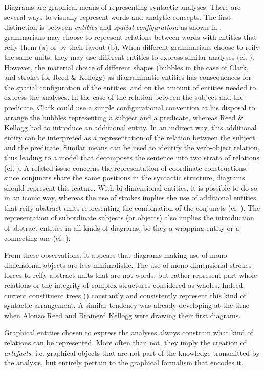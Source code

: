 \documentclass[output=paper]{langsci/langscibook}
\begin{document}
Diagrams are graphical means of representing syntactic analyses. There are several ways to visually represent words and analytic concepts. The first distinction is between \textit{entities} and \textit{spatial configuration}: as shown in , grammarians may choose to represent relations between words with entities that reify them (a) or by their layout (b). When different grammarians choose to reify the same units, they may use different entities to express similar analyses (cf. ). However, the material choice of different shapes (bubbles in the case of Clark, and strokes for Reed \& Kellogg) as diagrammatic entities has consequences for the spatial configuration of the entities, and on the amount of entities needed to express the analyses. In the case of the relation between the subject and the predicate, Clark could use a simple configurational convention at his disposal to arrange the bubbles representing a subject and a predicate, whereas Reed \& Kellogg had to introduce an additional entity. In an indirect way, this additional entity can be interpreted as a representation of the relation between the subject and the predicate. Similar means can be used to identify the verb-object relation, thus leading to a model that decomposes the sentence into two strata of relations (cf. ). A related issue concerns the representation of coordinate constructions: since conjuncts share the same positions in the syntactic structure, diagrams should represent this feature. With bi-dimensional entities, it is possible to do so in an iconic way, whereas the use of strokes implies the use of additional entities that reify abstract units representing the combination of the conjuncts (cf. ). The representation of subordinate subjects (or objects) also implies the introduction of abstract entities in all kinds of diagrams, be they a wrapping entity or a connecting one (cf. ). 

From these observations, it appears that diagrams making use of mono-dimensional objects are less minimalistic. The use of mono-dimensional strokes forces to reify abstract units that are not words, but rather represent part-whole relations or the integrity of complex structures considered as wholes. Indeed, current constituent trees () constantly and consistently represent this kind of syntactic arrangement. A similar tendency was already developing at the time when Alonzo Reed and Brainerd Kellogg were drawing their first diagrams.

Graphical entities chosen to express the analyses always constrain what kind of relations can be represented. More often than not, they imply the creation of \textit{artefacts}, i.e. graphical objects that are not part of the knowledge transmitted by the analysis, but entirely pertain to the graphical formalism that encodes it.


{\sloppy\printbibliography[heading=subbibliography,notkeyword=this]}
\end{document}
